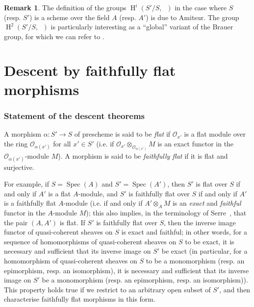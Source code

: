 \documentclass{article}
\theoremstyle{plain}
\theoremstyle{definition}
\newenvironment{definition}[1]
  {\renewcommand\theinnercustomdefinition{#1}\innercustomdefinition}
  {\endinnercustomdefinition}
\newtheorem*{remark*}{Remark}
\newcommand{\sh}[1]{{\mathscr{#1}}}
\DeclareMathOperator{\HH}{H}
\DeclareMathOperator{\Gm}{G_m}
\DeclareMathOperator{\Spec}{Spec}
\newcommand{\oldpage}[1]{\marginpar{\footnotesize$\Big\vert$ \textit{p.~#1}}}
\begin{document}
\begin{remark*}
  The definition of the groups $\HH^i(S'/S,\Gm)$ in the case where $S$ (resp. $S'$) is a scheme over the field $A$ (resp. $A'$) is due to Amitsur.
  The group $\HH^2(S'/S,\Gm)$ is particularly interesting as a ``global'' variant of the Brauer group, for which we can refer to \cite[chap.~VII]{1}.
\end{remark*}



\part{Descent by faithfully flat morphisms}
\label{B}

\section{Statement of the descent theorems}
\label{B.1}

\begin{definition}{1.1}
  A morphism $\alpha\colon S'\to S$ of prescheme is said to be \emph{flat} if $\sh{O}_{x'}$ is a flat module over the ring $\sh{O}_{\alpha(x')}$ for all $x'\in S'$ (i.e. if $\sh{O}_{x'}\otimes_{\sh{O}_{\alpha(x')}}M$ is an exact functor in the $\sh{O}_{\alpha(x')}$-module $M$).
  A morphism is said to be \emph{faithfully flat} if it is flat and surjective.
\end{definition}

For example, if $S=\Spec(A)$ and $S'=\Spec(A')$, then $S'$ is flat over $S$ if and only if $A'$ is a flat $A$-module, and $S'$ is faithfully flat over $S$ if and only if $A'$ is a faithfully flat $A$-module (i.e. if and only if $A'\otimes_A M$ is an \emph{exact} and \emph{faithful} functor in the $A$-module $M$);
this also implies, in the terminology of Serre~\cite{5}, that the pair $(A,A')$ is flat.
If $S'$ is faithfully flat over $S$, then the inverse image functor of quasi-coherent sheaves on $S$ is exact and faithful;
in other words, for a sequence of homomorphisms of
\oldpage{190-17}
quasi-coherent sheaves on $S$ to be exact, it is necessary and sufficient that its inverse image on $S'$ be exact (in particular, for a homomorphism of quasi-coherent sheaves on $S$ to be a monomorphism (resp. an epimorphism, resp. an isomorphism), it is necessary and sufficient that its inverse image on $S'$ be a monomorphism (resp. an epimorphism, resp. an isomorphism)).
This property holds true if we restrict to an arbitrary open subset of $S'$, and then characterise faithfully flat morphisms in this form.
\end{document}
